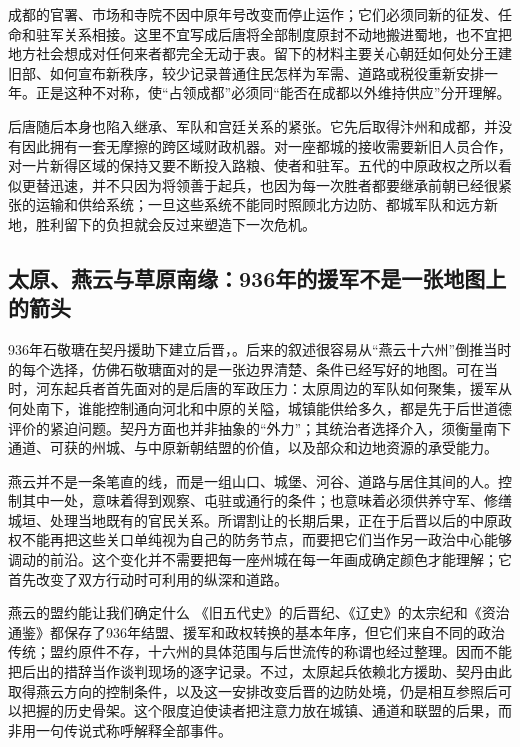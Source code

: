 成都的官署、市场和寺院不因中原年号改变而停止运作；它们必须同新的征发、任命和驻军关系相接。这里不宜写成后唐将全部制度原封不动地搬进蜀地，也不宜把地方社会想成对任何来者都完全无动于衷。留下的材料主要关心朝廷如何处分王建旧部、如何宣布新秩序，较少记录普通住民怎样为军需、道路或税役重新安排一年。正是这种不对称，使“占领成都”必须同“能否在成都以外维持供应”分开理解。

后唐随后本身也陷入继承、军队和宫廷关系的紧张。它先后取得汴州和成都，并没有因此拥有一套无摩擦的跨区域财政机器。对一座都城的接收需要新旧人员合作，对一片新得区域的保持又要不断投入路粮、使者和驻军。五代的中原政权之所以看似更替迅速，并不只因为将领善于起兵，也因为每一次胜者都要继承前朝已经很紧张的运输和供给系统；一旦这些系统不能同时照顾北方边防、都城军队和远方新地，胜利留下的负担就会反过来塑造下一次危机。

\subsection{太原、燕云与草原南缘：936年的援军不是一张地图上的箭头}

936年石敬瑭在契丹援助下建立后晋，。后来的叙述很容易从“燕云十六州”倒推当时的每个选择，仿佛石敬瑭面对的是一张边界清楚、条件已经写好的地图。可在当时，河东起兵者首先面对的是后唐的军政压力：太原周边的军队如何聚集，援军从何处南下，谁能控制通向河北和中原的关隘，城镇能供给多久，都是先于后世道德评价的紧迫问题。契丹方面也并非抽象的“外力”；其统治者选择介入，须衡量南下通道、可获的州城、与中原新朝结盟的价值，以及部众和边地资源的承受能力。

燕云并不是一条笔直的线，而是一组山口、城堡、河谷、道路与居住其间的人。控制其中一处，意味着得到观察、屯驻或通行的条件；也意味着必须供养守军、修缮城垣、处理当地既有的官民关系。所谓割让的长期后果，正在于后晋以后的中原政权不能再把这些关口单纯视为自己的防务节点，而要把它们当作另一政治中心能够调动的前沿。这个变化并不需要把每一座州城在每一年画成确定颜色才能理解；它首先改变了双方行动时可利用的纵深和道路。

\begin{debate}{燕云的盟约能让我们确定什么}
《旧五代史》的后晋纪、《辽史》的太宗纪和《资治通鉴》都保存了936年结盟、援军和政权转换的基本年序，但它们来自不同的政治传统；盟约原件不存，十六州的具体范围与后世流传的称谓也经过整理。因而不能把后出的措辞当作谈判现场的逐字记录。不过，太原起兵依赖北方援助、契丹由此取得燕云方向的控制条件，以及这一安排改变后晋的边防处境，仍是相互参照后可以把握的历史骨架。这个限度迫使读者把注意力放在城镇、通道和联盟的后果，而非用一句传说式称呼解释全部事件。
\end{debate}


